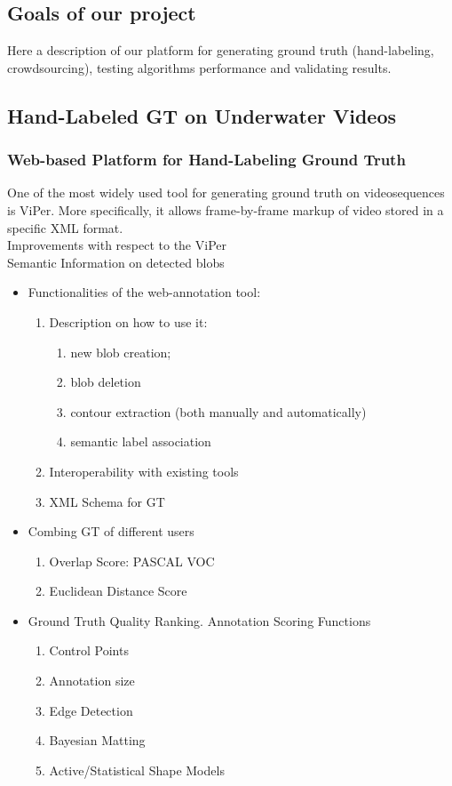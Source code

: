 \subsection{Goals of our project}
Here a description of our platform for generating ground truth (hand-labeling, crowdsourcing), testing algorithms performance and validating results.\\ 
\subsection{Hand-Labeled GT on Underwater Videos}
\subsubsection{Web-based Platform for Hand-Labeling Ground Truth}
One of the most widely used tool for generating ground truth on videosequences is ViPer. More specifically, it allows frame-by-frame markup of video
stored in a specific XML format. \\
Improvements with respect to the ViPer\\
Semantic Information on detected blobs
\begin{itemize}
\item Functionalities of the web-annotation tool:
\begin{enumerate}
\item Description on how to use it:
\begin{enumerate}
\item new blob creation;
\item blob deletion
\item contour extraction (both manually and automatically)
\item semantic label association
\end{enumerate}
\item Interoperability with existing tools
\item XML Schema for GT
\end{enumerate}
\item Combing GT of different users
\begin{enumerate}
\item Overlap Score: PASCAL VOC
\item Euclidean Distance Score
\end{enumerate}
\item Ground Truth Quality Ranking. Annotation Scoring Functions
\begin{enumerate} 
\item Control Points
\item Annotation size
\item Edge Detection
\item Bayesian Matting
\item Active/Statistical Shape Models
\end{enumerate}
\end{itemize}
